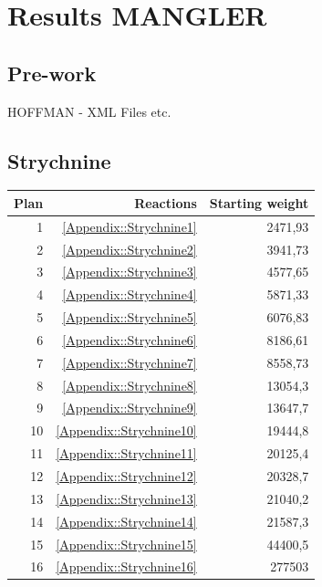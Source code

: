 \documentclass[a4paper,10pt,titlepage]{paper}
\begin{document}
\section{Results MANGLER}
\label{sec::Results}
\subsection{Pre-work}
HOFFMAN - XML Files etc.
\subsection{Strychnine}
\begin{table}[H]
\centering
\begin{tabular}{|r|r|r|}
\hline
Plan & Reactions & Starting weight \\ \hline
1 & \ref{Appendix::Strychnine1} & 2471,93 \\\hline
2 & \ref{Appendix::Strychnine2} & 3941,73 \\\hline
3 & \ref{Appendix::Strychnine3} & 4577,65 \\\hline
4 & \ref{Appendix::Strychnine4} & 5871,33 \\\hline
5 & \ref{Appendix::Strychnine5} & 6076,83 \\\hline
6 & \ref{Appendix::Strychnine6} & 8186,61 \\\hline
7 & \ref{Appendix::Strychnine7} & 8558,73 \\\hline
8 & \ref{Appendix::Strychnine8} & 13054,3 \\\hline
9 & \ref{Appendix::Strychnine9} & 13647,7 \\\hline
10 & \ref{Appendix::Strychnine10} & 19444,8 \\\hline
11 & \ref{Appendix::Strychnine11} & 20125,4 \\\hline
12 & \ref{Appendix::Strychnine12} & 20328,7 \\\hline
13 & \ref{Appendix::Strychnine13} & 21040,2 \\\hline
14 & \ref{Appendix::Strychnine14} & 21587,3 \\\hline
15 & \ref{Appendix::Strychnine15} & 44400,5 \\\hline
16 & \ref{Appendix::Strychnine16} & 277503 \\\hline

\end{tabular}
\end{table}
\end{document}
